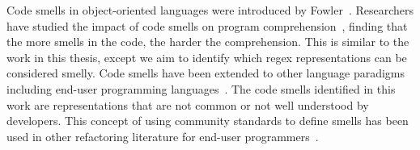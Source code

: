 Code smells in object-oriented languages were introduced by Fowler~. Researchers have studied the impact of code smells on program comprehension~, finding that the more smells in the code, the harder the comprehension. This is similar to the work in this thesis, except we aim to identify which  regex representations can be considered smelly.
Code smells have been extended to other language paradigms including end-user programming languages~. The code smells identified in this work are representations that are not common or not well understood by developers. This concept of using community standards to define smells has been used in other refactoring literature  for end-user programmers~.
